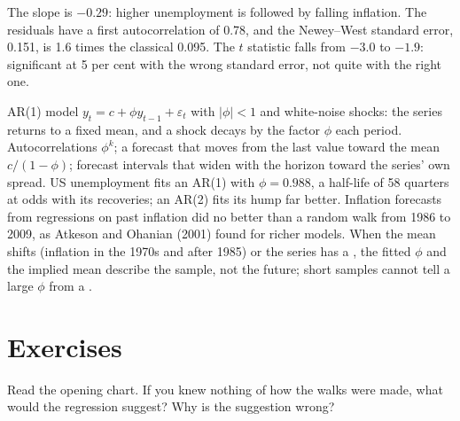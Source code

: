\label{lst:b2:time-series:hac}

\label{out:b2:time-series:hac}

The slope is $-0.29$: higher unemployment is followed by falling inflation. The residuals have a first autocorrelation of
0.78, and the Newey--West standard error, 0.151, is 1.6 times the classical 0.095. The $t$ statistic falls from $-3.0$ to
$-1.9$: significant at 5 per cent with the wrong standard error, not quite with the right one.

\begin{model}{AR(1) model}
\assumes $y_t = c + \phi y_{t-1} + \varepsilon_t$ with $|\phi| < 1$ and white-noise shocks: the series returns to a fixed
mean, and a shock decays by the factor $\phi$ each period.
\predicts Autocorrelations $\phi^k$; a forecast that moves from the last value toward the mean $c/(1 - \phi)$; forecast
intervals that widen with the horizon toward the series' own spread.
\tested US unemployment fits an AR(1) with $\phi = 0.988$, a half-life of 58 quarters at odds with its recoveries; an AR(2)
fits its hump far better. Inflation forecasts from regressions on past inflation did no better than a random walk from
1986 to 2009, as Atkeson and Ohanian (2001) found for richer models.
\breaks When the mean shifts (inflation in the 1970s and after 1985) or the series has a , the fitted $\phi$ and
the implied mean describe the sample, not the future; short samples cannot tell a large $\phi$ from a .
\end{model}

\section{Exercises}\label{sec:b2:time-series:exercises}

\begin{exercise}[$\star$]\label{exo:b2:time-series:1}
Read the opening chart. If you knew nothing of how the walks were made, what would the regression suggest? Why is the
suggestion wrong?
\end{exercise}

